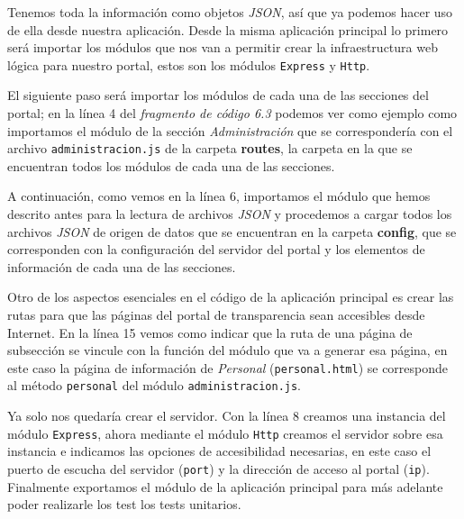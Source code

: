 Tenemos toda la información como objetos \textit{JSON}, así que ya podemos hacer uso de ella desde nuestra aplicación. Desde la misma aplicación principal lo primero será importar los módulos que nos van a permitir crear la infraestructura web lógica para nuestro portal, estos son los módulos {\tt Express} y {\tt Http}.

\bigskip
El siguiente paso será importar los módulos de cada una de las secciones del portal; en la línea 4 del \textit{fragmento de código 6.3} podemos ver como ejemplo como importamos el módulo de la sección \textit{Administración} que se correspondería con el archivo {\tt administracion.js} de la carpeta \textbf{routes}, la carpeta en la que se encuentran todos los módulos de cada una de las secciones.

\bigskip
A continuación, como vemos en la línea 6, importamos el módulo que hemos descrito antes para la lectura de archivos \textit{JSON} y procedemos a cargar todos los archivos \textit{JSON} de origen de datos que se encuentran en la carpeta \textbf{config}, que se corresponden con la configuración del servidor del portal y los elementos de información de cada una de las secciones.

\bigskip
Otro de los aspectos esenciales en el código de la aplicación principal es crear las rutas para que las páginas del portal de transparencia sean accesibles desde Internet. En la línea 15 vemos como indicar que la ruta de una página de subsección se vincule con la función del módulo que va a generar esa página, en este caso la página de información de \textit{Personal} ({\tt personal.html}) se corresponde al método {\tt personal} del módulo {\tt administracion.js}.

\newpage

Ya solo nos quedaría crear el servidor. Con la línea 8 creamos una instancia del módulo {\tt Express}, ahora mediante el módulo {\tt Http} creamos el servidor sobre esa instancia e indicamos las opciones de accesibilidad necesarias, en este caso el puerto de escucha del servidor ({\tt port}) y la dirección de acceso al portal ({\tt ip}). Finalmente exportamos el módulo de la aplicación principal para más adelante poder realizarle los test los tests unitarios.

